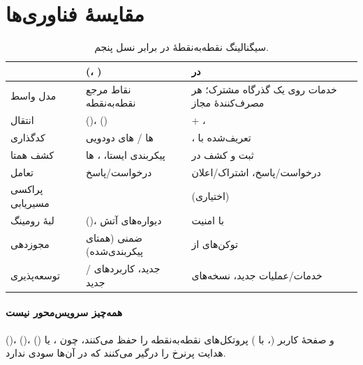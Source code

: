 \documentclass[11pt,a4paper]{article}
\begin{document}
\section{مقایسهٔ فناوری‌ها}
\begin{table}[htbp]
\centering\small
\caption{سیگنالینگ نقطه‌به‌نقطهٔ  در برابر  نسل پنجم.}\label{tab:cmp}
\begin{tabularx}{\linewidth}{@{}l Y Y@{}}
\toprule
{} &  (، ) &  در  \\
\midrule
مدل واسط         & نقاط مرجع نقطه‌به‌نقطه                 & خدمات روی یک گذرگاه مشترک؛ هر مصرف‌کنندهٔ مجاز \\
انتقال           &  ()،  () &  + ،  \\
کدگذاری          & ها / های دودویی      & ، تعریف‌شده با  \\
کشف همتا         & پیکربندی ایستا، ، ها & ثبت و کشف در  \\
تعامل            & درخواست/پاسخ                           & درخواست/پاسخ، اشتراک/اعلان \\
پراکسی مسیریابی  &                               &  (اختیاری) \\
لبهٔ رومینگ      &  ()، دیواره‌های آتش  &  با امنیت  \\
مجوزدهی          & ضمنی (همتای پیکربندی‌شده)              & توکن‌های  از  \\
توسعه‌پذیری      & / جدید، کاربردهای جدید & خدمات/عملیات جدید، نسخه‌های  \\
\bottomrule
\end{tabularx}
\end{table}

\paragraph{همه‌چیز سرویس‌محور نیست}  ()،  ()،  () و صفحهٔ کاربر (، 
با ) پروتکل‌های نقطه‌به‌نقطه را حفظ می‌کنند، چون ،  یا هدایت پرنرخ را درگیر می‌کنند که  در
آن‌ها سودی ندارد.

\end{document}
